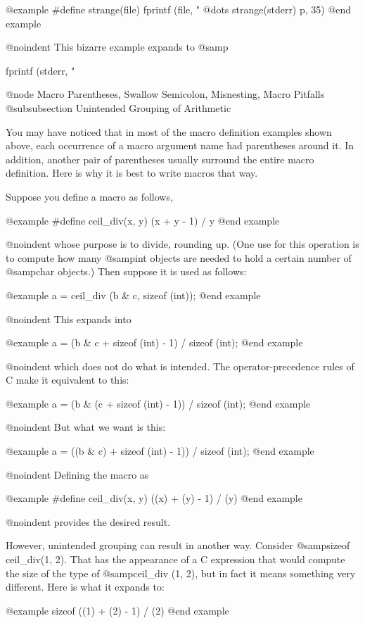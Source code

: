 {@example
#define strange(file) fprintf (file, "%
@dots{}
strange(stderr) p, 35)
@end example

@noindent
This bizarre example expands to @samp{fprintf (stderr, "%

@node Macro Parentheses, Swallow Semicolon, Misnesting, Macro Pitfalls
@subsubsection Unintended Grouping of Arithmetic

You may have noticed that in most of the macro definition examples shown
above, each occurrence of a macro argument name had parentheses around it.
In addition, another pair of parentheses usually surround the entire macro
definition.  Here is why it is best to write macros that way.

Suppose you define a macro as follows,

@example
#define ceil_div(x, y) (x + y - 1) / y
@end example

@noindent
whose purpose is to divide, rounding up.  (One use for this operation is
to compute how many @samp{int} objects are needed to hold a certain
number of @samp{char} objects.)  Then suppose it is used as follows:

@example
a = ceil_div (b & c, sizeof (int));
@end example

@noindent
This expands into

@example
a = (b & c + sizeof (int) - 1) / sizeof (int);
@end example

@noindent
which does not do what is intended.  The operator-precedence rules of
C make it equivalent to this:

@example
a = (b & (c + sizeof (int) - 1)) / sizeof (int);
@end example

@noindent
But what we want is this:

@example
a = ((b & c) + sizeof (int) - 1)) / sizeof (int);
@end example

@noindent
Defining the macro as

@example
#define ceil_div(x, y) ((x) + (y) - 1) / (y)
@end example

@noindent
provides the desired result.

However, unintended grouping can result in another way.  Consider
@samp{sizeof ceil_div(1, 2)}.  That has the appearance of a C expression
that would compute the size of the type of @samp{ceil_div (1, 2)}, but in
fact it means something very different.  Here is what it expands to:

@example
sizeof ((1) + (2) - 1) / (2)
@end example

}}
